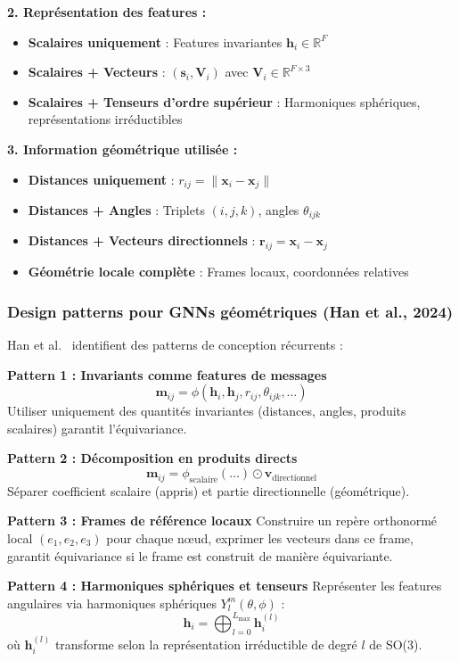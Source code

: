 \textbf{2. Représentation des features :}
\begin{itemize}
    \item \textbf{Scalaires uniquement} : Features invariantes $\mathbf{h}_i \in \mathbb{R}^F$
    \item \textbf{Scalaires + Vecteurs} : $(\mathbf{s}_i, \mathbf{V}_i)$ avec $\mathbf{V}_i \in \mathbb{R}^{F \times 3}$
    \item \textbf{Scalaires + Tenseurs d'ordre supérieur} : Harmoniques sphériques, représentations irréductibles
\end{itemize}

\textbf{3. Information géométrique utilisée :}
\begin{itemize}
    \item \textbf{Distances uniquement} : $r_{ij} = \|\mathbf{x}_i - \mathbf{x}_j\|$
    \item \textbf{Distances + Angles} : Triplets $(i,j,k)$, angles $\theta_{ijk}$
    \item \textbf{Distances + Vecteurs directionnels} : $\mathbf{r}_{ij} = \mathbf{x}_i - \mathbf{x}_j$
    \item \textbf{Géométrie locale complète} : Frames locaux, coordonnées relatives
\end{itemize}

\subsubsection{Design patterns pour GNNs géométriques (Han et al., 2024)}

Han et al.~\cite{Han2024} identifient des patterns de conception récurrents :

\textbf{Pattern 1 : Invariants comme features de messages}
\[
\mathbf{m}_{ij} = \phi(\mathbf{h}_i, \mathbf{h}_j, r_{ij}, \theta_{ijk}, \ldots)
\]
Utiliser uniquement des quantités invariantes (distances, angles, produits scalaires) garantit l'équivariance.

\textbf{Pattern 2 : Décomposition en produits directs}
\[
\mathbf{m}_{ij} = \phi_{\text{scalaire}}(\ldots) \odot \mathbf{v}_{\text{directionnel}}
\]
Séparer coefficient scalaire (appris) et partie directionnelle (géométrique).

\textbf{Pattern 3 : Frames de référence locaux}
Construire un repère orthonormé local $(e_1, e_2, e_3)$ pour chaque nœud, exprimer les vecteurs dans ce frame, garantit équivariance si le frame est construit de manière équivariante.

\textbf{Pattern 4 : Harmoniques sphériques et tenseurs}
Représenter les features angulaires via harmoniques sphériques $Y_l^m(\theta, \phi)$ :
\[
\mathbf{h}_i = \bigoplus_{l=0}^{L_{\max}} \mathbf{h}_i^{(l)}
\]
où $\mathbf{h}_i^{(l)}$ transforme selon la représentation irréductible de degré $l$ de SO(3).

